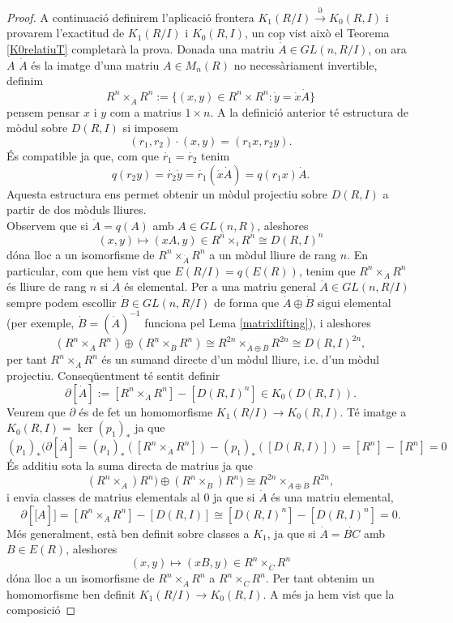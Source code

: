 \begin{proof}
\indent A continuació definirem l'aplicació frontera $K_1(R/I)\xrightarrow{\partial}K_0(R,I)$ i provarem l'exactitud de $K_1(R/I)$ i $K_0(R,I)$, un cop vist això el Teorema \ref{K0relatiuT} completarà la prova. Donada una matriu $\dot{A}\in GL(n,R/I)$, on ara $A$ $\dot{A}$ és la imatge d'una matriu $A\in M_n(R)$ no necessàriament invertible, definim
$$
R^n \times _{\dot{A}}  R^n := \{ (x,y) \in R^n \times R^n : \dot{y}=\dot{x} \dot{A} \}			
$$
pensem pensar $x$ i $y$ com a matrius $1\times n$. A la definició anterior té estructura de mòdul sobre $D(R,I)$ si imposem
$$
(r_1,r_2)\cdot (x,y) = (r_1x,r_2y).
$$
És compatible ja que, com que $\dot{r_1}=\dot{r_2}$ tenim
$$
q(r_2y)=\dot{r_2}\dot{y} = \dot{r_1}(\dot{x}\dot{A}) = q(r_1x)\dot{A}.
$$
Aquesta estructura ens permet obtenir un mòdul projectiu sobre $D(R,I)$ a partir de dos mòduls lliures. 
\\
Observem que si $\dot{A}=q(A)$ amb $A\in GL(n,R)$, aleshores
$$
(x,y)\mapsto (xA,y)\in R^n \times_i R^n \cong D(R,I)^n
$$
dóna lloc a un isomorfisme de $R^n\times_{\dot{A}} R^n$ a un mòdul lliure de rang $n$. En particular, com que hem vist que $E(R/I)=q(E(R))$, tenim que $R^n\times_{\dot{A}}R^n$ és lliure de rang $n$ si $\dot{A}$ és elemental. Per a una matriu general $\dot{A}\in GL(n,R/I)$ sempre podem escollir $\dot{B}\in GL(n,R/I)$ de forma que $\dot{A}\oplus \dot{B}$ sigui elemental (per exemple, $\dot{B}=(\dot{A})^{-1}$ funciona pel Lema \ref{matrixlifting}), i aleshores
$$
(R^n\times_{\dot{A}} R^n) \oplus (R^n \times_{\dot{B}}R^n) \cong R^{2n}\times_{\dot{A}\oplus\dot{B}}R^{2n} \cong D(R,I)^{2n},
$$
per tant $R^n \times_{\dot{A}}R^n$ és un sumand directe d'un mòdul lliure, i.e. d'un mòdul projectiu. Conseqüentment té sentit definir
$$
\partial [ \dot{A} ] := [R^n\times_{\dot{A}}R^n]-[D(R,I)^n]\in K_0(D(R,I)).
$$
\indent Veurem que $\partial$ és de fet un homomorfisme $K_1(R/I)\rightarrow K_0(R,I)$. Té imatge a $K_0(R,I)=\ker(p_1)_*$ ja que 
$$
(p_1)_*(\partial [\dot{A}] = (p_1)_*([R^n \times_{\dot{A}} R^n])
 - (p_1)_*([D(R,I)])=[R^n]-[R^n]=0$$
És additiu sota la suma directa de matrius ja que
$$
(R^n \times_{\dot{A}}) R^n) \oplus (R^n \times_{\dot{B}}) R^n) \cong R^{2n} \times_{\dot{A}\oplus \dot{B}} R^{2n}, 
$$
i envia classes de matrius elementals al $0$ ja que si $\dot{A}$ és una matriu elemental,
$$
\partial [\dot[A]] = [R^n \times_{\dot{A}} R^n] - [D(R,I)] \cong [D(R,I)^n]-[D(R,I)^n]=0.
$$
Més generalment, està ben definit sobre classes a $K_1$, ja que si $\dot{A}=\dot{BC}$ amb $B\in E(R)$, aleshores
$$
(x,y)\mapsto(xB,y)\in R^n \times_{\dot{C}}R^n
$$
dóna lloc a un isomorfisme de $R^n \times_{\dot{A}} R^n$ a $R^n\times_{\dot{C}} R^n$. Per tant obtenim un homomorfisme ben definit $K_1(R/I)\rightarrow K_0(R,I)$. A més ja hem vist que la composició

\end{proof}
